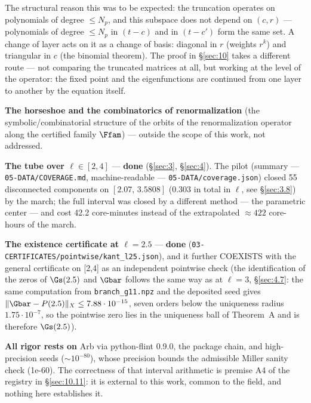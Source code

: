The structural reason this was to be expected: the truncation
operates on polynomials of degree $\le N_p$, and this subspace does not
depend on $(c, r)$ --- polynomials of degree $\le N_p$ in $(t-c)$ and in
$(t-c')$ form the same set. A change of layer acts on it as a change
of basis: diagonal in $r$ (weights $r^k$) and triangular in $c$ (the
binomial theorem). The proof in \S\ref{sec:10}{} takes a different route --- not
comparing the truncated matrices at all, but working at the level of
the operator: the fixed point and the eigenfunctions are continued
from one layer to another by the equation itself.

\textbf{The horseshoe and the combinatorics of renormalization} (the
symbolic/combinatorial structure of the orbits of the renormalization
operator along the certified family $\Ffam$) --- outside the scope of this
work, not addressed.

\textbf{The tube over $\ell \in [2,4]$} --- \textbf{done} (\S\ref{sec:3}, \S\ref{sec:4}). The pilot (summary ---
\texttt{05-\allowbreak DATA/\allowbreak COVERAGE.md}, machine-readable --- \texttt{05-\allowbreak DATA/\allowbreak coverage.json})
closed 55 disconnected components on $[2.07,\, 3.5808]$ (0.303 in total in
$\ell$, see \S\ref{sec:3.8}) by the march; the full interval was closed by a
different method --- the parametric center --- and cost 42.2 core-minutes
instead of the extrapolated $\approx 422$ core-hours of the march.

\textbf{The existence certificate at $\ell=2.5$} --- \textbf{done}
(\texttt{03-\allowbreak CERTIFICATES/\allowbreak pointwise/\allowbreak kant\_\allowbreak l25.json}), and it further COEXISTS
with the general certificate on [2,4] as an independent pointwise
check (the identification of the zeros of $\Gs(2.5)$ and $\Gbar$ follows the
same way as at $\ell = 3$, \S\ref{sec:4.7}: the same computation from
\texttt{branch\_\allowbreak g11.npz} and the deposited seed gives
$\|\Gbar - P(2.5)\|_{X} \le 7.88\cdot 10^{-15}$, seven orders below the
uniqueness radius $1.75\cdot 10^{-7}$, so the pointwise zero lies in the
uniqueness ball of Theorem~A and is therefore $\Gs(2.5)$).

\textbf{All rigor rests on} Arb via python-flint 0.9.0, the package chain,
and high-precision seeds ($\sim 10^{-80}$), whose precision bounds the
admissible Miller sanity check (1e-60). The correctness of that interval
arithmetic is premise A4 of the registry in \S\ref{sec:10.11}: it is external to
this work, common to the field, and nothing here establishes it.

